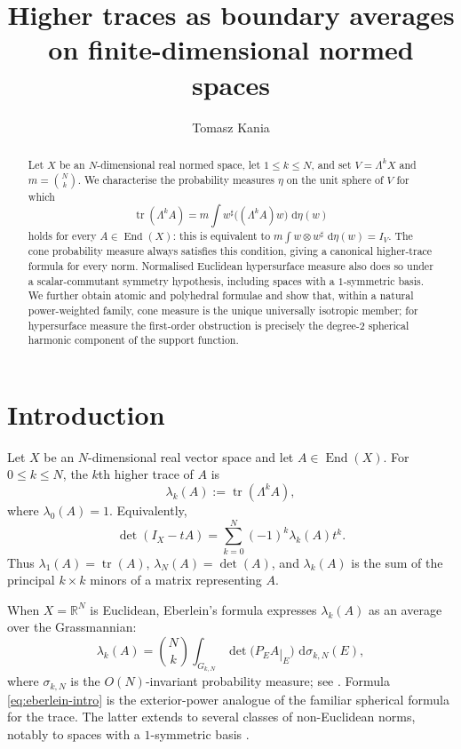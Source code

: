\documentclass[11pt,a4paper]{amsart}
\title[Higher traces as boundary averages]{Higher traces as boundary averages on finite-dimensional normed spaces}
\author{Tomasz Kania}
\date{}
\numberwithin{equation}{section}
\theoremstyle{plain}
\theoremstyle{definition}
\theoremstyle{remark}
\DeclareMathOperator{\End}{End}
\DeclareMathOperator{\tr}{tr}
\newcommand{\R}{\mathbb{R}}
\newcommand{\dd}{\,\mathrm{d}}
\newcommand{\Id}{I}
\newcommand{\restr}{\mathbin{|}}
\begin{document}
\begin{abstract}
Let $X$ be an $N$-dimensional real normed space, let $1\leqslant k\leqslant N$, and set $V=\Lambda^kX$ and $m=\binom Nk$. We characterise the probability measures $\eta$ on the unit sphere of $V$ for which
\[
\tr(\Lambda^kA)=m\int w^\sharp\big((\Lambda^kA)w\big)\,\dd\eta(w)
\]
holds for every $A\in\End(X)$: this is equivalent to $m\int w\otimes w^\sharp\,\dd\eta(w)=\Id_V$. The cone probability measure always satisfies this condition, giving a canonical higher-trace formula for every norm. Normalised Euclidean hypersurface measure also does so under a scalar-commutant symmetry hypothesis, including spaces with a $1$-symmetric basis. We further obtain atomic and polyhedral formulae and show that, within a natural power-weighted family, cone measure is the unique universally isotropic member; for hypersurface measure the first-order obstruction is precisely the degree-$2$ spherical harmonic component of the support function.
\end{abstract}

\maketitle

\section{Introduction}

Let $X$ be an $N$-dimensional real vector space and let $A\in\End(X)$. For $0\leqslant k\leqslant N$, the $k$th higher trace of $A$ is
\[
\lambda_k(A):=\tr(\Lambda^kA),
\]
where $\lambda_0(A)=1$. Equivalently,
\begin{equation}\label{eq:char-poly}
\det(\Id_X-tA)=\sum_{k=0}^N(-1)^k\lambda_k(A)t^k.
\end{equation}
Thus $\lambda_1(A)=\tr(A)$, $\lambda_N(A)=\det(A)$, and $\lambda_k(A)$ is the sum of the principal $k\times k$ minors of a matrix representing $A$.

When $X=\R^N$ is Euclidean, Eberlein's formula expresses $\lambda_k(A)$ as an average over the Grassmannian:
\begin{equation}\label{eq:eberlein-intro}
\lambda_k(A)=\binom Nk\int_{G_{k,N}}\det\big(P_EA\restr_E\big)\,\dd\sigma_{k,N}(E),
\end{equation}
where $\sigma_{k,N}$ is the $O(N)$-invariant probability measure; see \cite{Eberlein,MorrisonHigher}. Formula \eqref{eq:eberlein-intro} is the exterior-power analogue of the familiar spherical formula for the trace. The latter extends to several classes of non-Euclidean norms, notably to spaces with a $1$-symmetric basis \cite{KaniaTrace,KM}.
\end{document}
